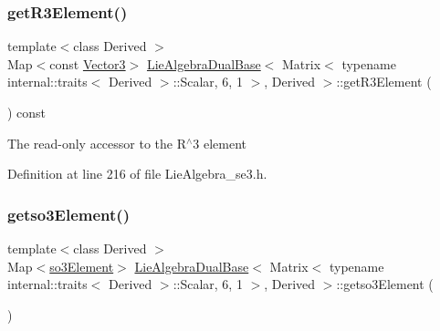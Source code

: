 \subsubsection{\texorpdfstring{get\+R3\+Element()}{getR3Element()}\hspace{0.1cm}{\footnotesize\ttfamily [2/2]}}
{\footnotesize\ttfamily template$<$class Derived $>$ \\
Map$<$const \hyperlink{class_lie_algebra_dual_base_3_01_matrix_3_01typename_01internal_1_1traits_3_01_derived_01_4_1_1_7557dc73cbfcbc32e399b9855a977d47_acd7fd5207d2c438f3f26f99eeedf280d}{Vector3}$>$ \hyperlink{class_lie_algebra_dual_base}{Lie\+Algebra\+Dual\+Base}$<$ Matrix$<$ typename internal\+::traits$<$ Derived $>$\+::Scalar, 6, 1 $>$, Derived $>$\+::get\+R3\+Element (\begin{DoxyParamCaption}{ }\end{DoxyParamCaption}) const\hspace{0.3cm}{\ttfamily [inline]}}

The read-\/only accessor to the R$^\wedge$3 element 

Definition at line 216 of file Lie\+Algebra\+\_\+se3.\+h.

\hypertarget{class_lie_algebra_dual_base_3_01_matrix_3_01typename_01internal_1_1traits_3_01_derived_01_4_1_1_7557dc73cbfcbc32e399b9855a977d47_a524db7791aae1703b62f8b30c974a287}{}\label{class_lie_algebra_dual_base_3_01_matrix_3_01typename_01internal_1_1traits_3_01_derived_01_4_1_1_7557dc73cbfcbc32e399b9855a977d47_a524db7791aae1703b62f8b30c974a287} 
\subsubsection{\texorpdfstring{getso3\+Element()}{getso3Element()}\hspace{0.1cm}{\footnotesize\ttfamily [1/2]}}
{\footnotesize\ttfamily template$<$class Derived $>$ \\
Map$<$\hyperlink{class_lie_algebra_dual_base_3_01_matrix_3_01typename_01internal_1_1traits_3_01_derived_01_4_1_1_7557dc73cbfcbc32e399b9855a977d47_ab33be35099ff8bda572467ce899de5aa}{so3\+Element}$>$ \hyperlink{class_lie_algebra_dual_base}{Lie\+Algebra\+Dual\+Base}$<$ Matrix$<$ typename internal\+::traits$<$ Derived $>$\+::Scalar, 6, 1 $>$, Derived $>$\+::getso3\+Element (\begin{DoxyParamCaption}{ }\end{DoxyParamCaption})\hspace{0.3cm}{\ttfamily [inline]}}

